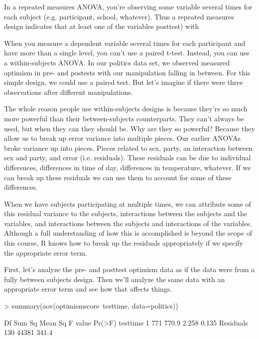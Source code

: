 \documentclass[12pt]{article}
\newcounter{subsubsubsection}[subsubsection]
\begin{document}
In a repeated measures ANOVA, you're observing some variable several times for
each subject (e.g. participant, school, whatever). Thus a repeated measures
design indicates that at least one of the variables
posttest) with 

When you measure a dependent variable several times for each participant and
have more than a single level, you can't use a paired t-test. Instead, you
can use a within-subjects ANOVA. In our politics data set, we observed measured
optimism in pre- and postests with our manipulation falling in between. For
this simple design, we could use a paired test. But let's imagine if there
were three observations after different manipulations.

The whole reason people use within-subjects designs is because they're so much
more powerful than their between-subjects counterparts. They can't always
be used, but when they can they should be. Why are they so powerful? Because
they allow us to break up error variance into multiple pieces. Our earlier
ANOVAs broke variance up into pieces. Pieces related to sex, party, an interaction
between sex and party, and error (i.e. residuals). These residuals can be due
to individual differences, differences in time of day, differences in temperature,
whatever. If we can break up these residuals we can use them to account for some
of these differences.

When we have subjects participating at multiple times, we can attribute some of
this residual variance to the subjects, interactions between the subjects and 
the variables, and interactions between the subjects and interactions of the
variables. Although a full understanding of how this is accomplished is beyond
the scope of this course, R knows how to break up the residuals appropriately
if we specify the appropriate error term.

First, let's analyze the pre- and posttest optimism data as if the data were
from a fully between subjects design. Then we'll analyze the same data with
an appropriate error term and see how that affects things.

\begin{Schunk}
\begin{Sinput}
> summary(aov(optimismscore~testtime, data=politics))
\end{Sinput}
\begin{Soutput}
             Df Sum Sq Mean Sq F value Pr(>F)
testtime      1    771   770.9   2.258  0.135
Residuals   130  44381   341.4               
\end{Soutput}
\end{Schunk}
\end{document}
